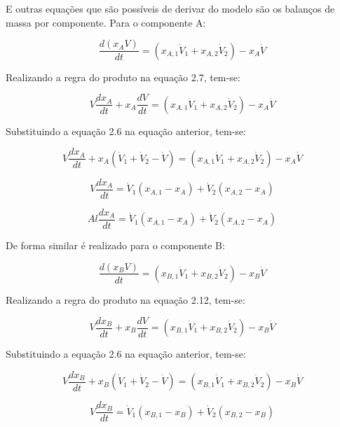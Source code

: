 \documentclass[
	12pt,				%
	openright,			%
	oneside,			%
	a4paper,			%
	english,			%
	french,				%
	spanish,			%
	brazil				%
	]{abntex2}
\begin{document}
E outras equações que são possíveis de derivar do modelo são os balanços de massa por componente. Para o componente A:

\begin{equation}
\frac{d(x_{A}V)}{dt}=(x_{A,1}\dot{V}_{1}+x_{A,2}\dot{V}_{2})-x_{A}\dot{V}
\end{equation}

Realizando a regra do produto na equação 2.7, tem-se:

\begin{equation}
V\frac{dx_{A}}{dt}+x_{A}\frac{dV}{dt}=(x_{A,1}\dot{V}_{1}+x_{A,2}\dot{V}_{2})-x_{A}\dot{V}
\end{equation}

Substituindo a equação 2.6 na equação anterior, tem-se:

\begin{equation}
V\frac{dx_{A}}{dt}+x_{A}(\dot{V}_{1}+\dot{V}_{2}-\dot{V})=(x_{A,1}\dot{V}_{1}+x_{A,2}\dot{V}_{2})-x_{A}\dot{V}
\end{equation}

\begin{equation}
V\frac{dx_{A}}{dt}=\dot{V}_{1}(x_{A,1}-x_{A})+\dot{V}_{2}(x_{A,2}-x_{A})
\end{equation}

\begin{equation}
Al\frac{dx_{A}}{dt}=\dot{V}_{1}(x_{A,1}-x_{A})+\dot{V}_{2}(x_{A,2}-x_{A})
\end{equation}

De forma similar é realizado para o componente B:

\begin{equation}
\frac{d(x_{B}V)}{dt}=(x_{B,1}\dot{V}_{1}+x_{B,2}\dot{V}_{2})-x_{B}\dot{V}
\end{equation}

Realizando a regra do produto na equação 2.12, tem-se:

\begin{equation}
V\frac{dx_{B}}{dt}+x_{B}\frac{dV}{dt}=(x_{B,1}\dot{V}_{1}+x_{B,2}\dot{V}_{2})-x_{B}\dot{V}
\end{equation}

Substituindo a equação 2.6 na equação anterior, tem-se:

\begin{equation}
V\frac{dx_{B}}{dt}+x_{B}(\dot{V}_{1}+\dot{V}_{2}-\dot{V})=(x_{B,1}\dot{V}_{1}+x_{B,2}\dot{V}_{2})-x_{B}\dot{V}
\end{equation}

\begin{equation}
V\frac{dx_{B}}{dt}=\dot{V}_{1}(x_{B,1}-x_{B})+\dot{V}_{2}(x_{B,2}-x_{B})
\end{equation}
\end{document}
